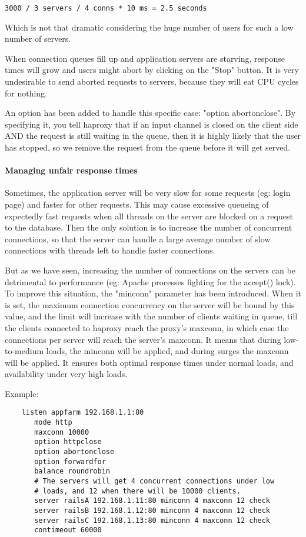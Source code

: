    \verb|3000 / 3 servers / 4 conns * 10 ms = 2.5 seconds|

Which is not that dramatic considering the huge number of users for such a low
number of servers.

When connection queues fill up and application servers are starving, response
times will grow and users might abort by clicking on the "Stop" button. It is
very undesirable to send aborted requests to servers, because they will eat
CPU cycles for nothing.

An option has been added to handle this specific case: "option abortonclose".
By specifying it, you tell haproxy that if an input channel is closed on the
client side AND the request is still waiting in the queue, then it is highly
likely that the user has stopped, so we remove the request from the queue
before it will get served.

\paragraph{Managing unfair response times}

Sometimes, the application server will be very slow for some requests (eg:
login page) and faster for other requests. This may cause excessive queueing
of expectedly fast requests when all threads on the server are blocked on a
request to the database. Then the only solution is to increase the number of
concurrent connections, so that the server can handle a large average number
of slow connections with threads left to handle faster connections.

But as we have seen, increasing the number of connections on the servers can
be detrimental to performance (eg: Apache processes fighting for the accept()
lock). To improve this situation, the "minconn" parameter has been introduced.
When it is set, the maximum connection concurrency on the server will be bound
by this value, and the limit will increase with the number of clients waiting
in queue, till the clients connected to haproxy reach the proxy's maxconn, in
which case the connections per server will reach the server's maxconn. It means
that during low-to-medium loads, the minconn will be applied, and during surges
the maxconn will be applied. It ensures both optimal response times under
normal loads, and availability under very high loads.

Example:

\begin{verbatim}
    listen appfarm 192.168.1.1:80
       mode http
       maxconn 10000
       option httpclose
       option abortonclose
       option forwardfor
       balance roundrobin
       # The servers will get 4 concurrent connections under low
       # loads, and 12 when there will be 10000 clients.
       server railsA 192.168.1.11:80 minconn 4 maxconn 12 check
       server railsB 192.168.1.12:80 minconn 4 maxconn 12 check
       server railsC 192.168.1.13:80 minconn 4 maxconn 12 check
       contimeout 60000
\end{verbatim}
